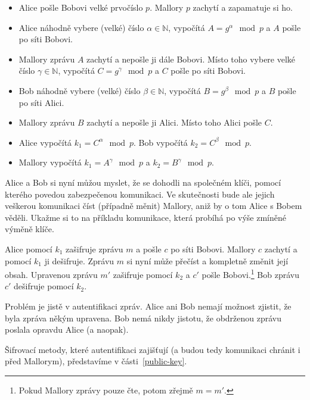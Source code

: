 \documentclass[
  program=infoi,
  biblatex,
  figures=false,
  glossaries,
  index
]{kidiplom}
\begin{document}
    \begin{itemize}
        \item
            Alice pošle Bobovi velké prvočíslo $p$.
            Mallory $p$ zachytí a zapamatuje si ho.
        \item
            Alice náhodně vybere (velké) číslo $\alpha \in \mathbb{N}$, vypočítá $A=g^\alpha \mod{p}$ a $A$ pošle po síti Bobovi.
        \item
            Mallory zprávu $A$ zachytí a nepošle ji dále Bobovi. Místo toho vybere velké číslo $\gamma \in \mathbb{N}$,
            vypočítá $C=g^\gamma \mod{p}$ a $C$ pošle po síti Bobovi.
        \item
            Bob náhodně vybere (velké) číslo $\beta \in \mathbb{N}$, vypočítá $B=g^\beta \mod{p}$ a $B$ pošle po síti Alici.
        \item
            Mallory zprávu $B$ zachytí a nepošle ji Alici. Místo toho Alici pošle $C$.
        \item
            Alice vypočítá $k_1=C^\alpha \mod{p}$. Bob vypočítá $k_2=C^\beta \mod{p}$.
        \item
            Mallory vypočítá $k_1=A^\gamma \mod{p}$ a $k_2=B^\gamma \mod{p}$.

    \end{itemize}


    Alice a Bob si nyní můžou myslet, že se dohodli na společném klíči, pomocí kterého povedou zabezpečenou komunikaci.
    Ve skutečnosti bude ale jejich veškerou komunikaci číst (případně měnit) Mallory, aniž by o tom Alice s Bobem věděli.
    Ukažme si to na příkladu komunikace, která probíhá po výše zmíněné výměně klíče.

    Alice pomocí $k_1$ zašifruje zprávu $m$ a pošle $c$ po síti Bobovi. Mallory $c$ zachytí a pomocí $k_1$ ji dešifruje.
    Zprávu $m$ si nyní může přečíst a kompletně změnit její obsah.
    Upravenou zprávu $m'$ zašifruje pomocí $k_2$ a $c'$ pošle Bobovi.\footnote{Pokud Mallory zprávy pouze čte, potom zřejmě $m = m'$.}
    Bob zprávu $c'$ dešifruje pomocí $k_2$.

    Problém je jistě v autentifikaci zpráv. Alice ani Bob nemají možnost zjistit, že byla zpráva někým upravena.
    Bob nemá nikdy jistotu, že obdrženou zprávu poslala opravdu Alice (a naopak).

    \medskip

    Šifrovací metody, které autentifikaci zajišťují (a budou tedy komunikaci chránit i před Mallorym), představíme v části~\ref{public-key}.
\end{document}
